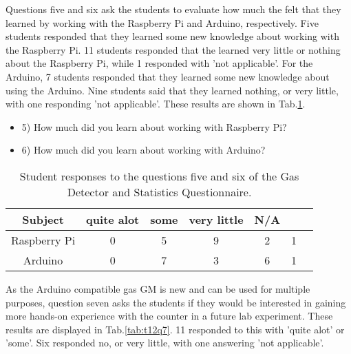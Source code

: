 Questions five and six ask the students to evaluate how much the felt that they learned by working with the Raspberry Pi and Arduino, respectively.
Five students responded that they learned some new knowledge about working with the Raspberry Pi.
11 students responded that the learned very little or nothing about the Raspberry Pi, while 1 responded with 'not applicable'.
For the Arduino, 7 students responded that they learned some new knowledge about using the Arduino.
Nine students said that they learned nothing, or very little, with one responding 'not applicable'.
These results are shown in Tab.\ref{tab:t12q56}.

\begin{table}[htpb]
  \scriptsize
  \begin{center}
    \caption{\scriptsize Student responses to the questions five and six of the Gas Detector and Statistics Questionnaire.}
    \label{tab:t12q56}
    \begin{itemize}
    \item 5) How much did you learn about working with Raspberry Pi?
    \item 6) How much did you learn about working with Arduino?
      
    \end{itemize}
    

    \begin{tabular}{|c | c | c | c | c | c | c|}
      \hline
      Subject & quite alot & some & very little & N/A\\
      \hline
      Raspberry Pi & 0 & 5 & 9 & 2 & 1 \\
      \hline
      Arduino & 0 & 7 & 3 & 6 & 1 \\
      \hline
    \end{tabular}
  \end{center}%
\end{table}


As the Arduino compatible gas GM is new and can be used for multiple purposes, question seven asks the students if they would be interested in gaining more hands-on experience with the counter in a future lab experiment.
These results are displayed in Tab.\ref{tab:t12q7}.
11 responded to this with 'quite alot' or 'some'.
Six responded no, or very little, with one answering 'not applicable'.

